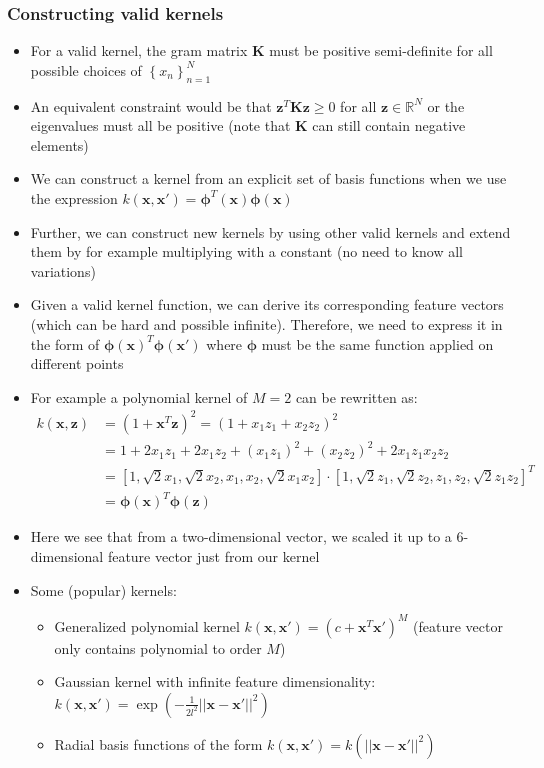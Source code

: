 \subsubsection{Constructing valid kernels}
\begin{itemize}
	\item For a valid kernel, the gram matrix $\bm{K}$ must be positive semi-definite for all possible choices of $\left\{x_n\right\}_{n=1}^{N}$
	\item An equivalent constraint would be that $\bm{z}^T \bm{K} \bm{z} \geq 0$ for all $\bm{z}\in\mathbb{R}^{N}$ or the eigenvalues must all be positive (note that $\bm{K}$ can still contain negative elements)
	\item We can construct a kernel from an explicit set of basis functions when we use the expression $k\left(\bm{x},\bm{x}'\right)=\bm{\phi}^T(\bm{x})\bm{\phi}(\bm{x})$
	\item Further, we can construct new kernels by using other valid kernels and extend them by for example multiplying with a constant (no need to know all variations)
	\item Given a valid kernel function, we can derive its corresponding feature vectors (which can be hard and possible infinite). Therefore, we need to express it in the form of $\bm{\phi}(\bm{x})^T \bm{\phi}(\bm{x}')$ where $\bm{\phi}$ must be the same function applied on different points
	\item For example a polynomial kernel of $M=2$ can be rewritten as:
	\begin{equation*}
		\begin{split}
			k\left(\bm{x},\bm{z}\right) & = \left(1+\bm{x}^T\bm{z}\right)^2 = \left(1 + x_1 z_1 + x_2 z_2\right)^2\\
			& = 1 + 2x_1 z_1 + 2x_1 z_2 + (x_1 z_1)^2 + (x_2 z_2)^2 + 2 x_1 z_1 x_2 z_2\\
			& = \left[1, \sqrt{2}x_1, \sqrt{2}x_2, x_1, x_2, \sqrt{2}x_1 x_2\right] \cdot \left[1, \sqrt{2}z_1, \sqrt{2}z_2, z_1, z_2, \sqrt{2}z_1 z_2\right]^T\\
			& = \bm{\phi}(\bm{x})^T \bm{\phi}(\bm{z})
		\end{split}
	\end{equation*}
	\item Here we see that from a two-dimensional vector, we scaled it up to a 6-dimensional feature vector just from our kernel
	\item Some (popular) kernels:
	\begin{itemize}
		\item Generalized polynomial kernel $k\left(\bm{x}, \bm{x}'\right) = \left(c + \bm{x}^T \bm{x}'\right)^{M}$ (feature vector only contains polynomial to order $M$)
		\item Gaussian kernel with infinite feature dimensionality: $k\left(\bm{x}, \bm{x}'\right) = \exp\left(-\frac{1}{2l^2} ||\bm{x}-\bm{x}'||^2\right)$
		\item Radial basis functions of the form $k\left(\bm{x}, \bm{x}'\right) = k\left(||\bm{x}-\bm{x}'||^2\right)$
	\end{itemize}
\end{itemize}
